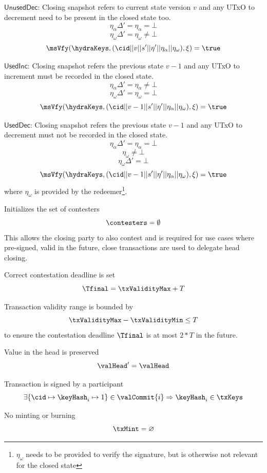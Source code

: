 \begin{menumerate}
\begin{menumerate}
	\item $\mathsf{UnusedDec}$: Closing snapshot refers to current state version $v$ and any UTxO to decrement need to be present in the closed state too.
	\[
	  \eta_\alpha\Delta' = \eta_\alpha = \bot
	\]
	\[
	  \eta_\omega\Delta' = \eta_\omega \neq \bot
	\]
	\[
	  \msVfy(\hydraKeys,(\cid || v || s' || \eta' || \eta_\alpha || \eta_\omega),\xi) = \true
	\]
	\item $\mathsf{UsedInc}$: Closing snapshot refers the previous state $v - 1$ and any UTxO to increment must be recorded in the closed state.
	  \[
		\eta_\alpha\Delta' = \eta_\alpha \neq \bot
	  \]
	  \[
	    \eta_\omega\Delta' = \eta_\omega = \bot
	  \]
	  \[
		\msVfy(\hydraKeys,(\cid || v - 1 || s' || \eta' || \eta_\alpha || \eta_\omega ),\xi) = \true
	\]
	\item $\mathsf{UsedDec}$: Closing snapshot refers the previous state $v - 1$ and any UTxO to decrement must not be recorded in the closed state.
	  \[
		\eta_\alpha\Delta' = \eta_\alpha = \bot
	  \]
	  \[ 
	    \eta_\omega \neq  \bot
	  \]
	  \[ 
	    \eta_\omega\Delta' = \bot
	  \]
	\[
	  \msVfy(\hydraKeys,(\cid || v - 1 || s' || \eta' || \eta_\alpha || \eta_\omega),\xi) = \true
	\]
	where $\eta_\omega$ is provided by the redeemer\footnote{$\eta_\omega$ needs to be provided to verify the signature, but is otherwise not relevant for the closed state}.
  \end{menumerate}

  \item Initializes the set of contesters
  \[
	\contesters = \emptyset
  \]
  This allows the closing party to also contest and is required for use
  cases where pre-signed, valid in the future, close transactions are
  used to delegate head closing.

  \item Correct contestation deadline is set
  \[
	\Tfinal = \txValidityMax + T
  \]
  \item Transaction validity range is bounded by
  \[
	\txValidityMax - \txValidityMin \leq T
  \]
  to ensure the contestation deadline $\Tfinal$ is at most $2*T$ in the future.
  \item Value in the head is preserved
  \[
	\valHead' = \valHead
  \]
  \item Transaction is signed by a participant
  \[
	\exists \{\cid \mapsto \keyHash_{i} \mapsto 1\} \in \valCommit{i} \Rightarrow \keyHash_{i} \in \txKeys
  \]
  \item No minting or burning
  \[
	\txMint = \varnothing
  \]
\end{menumerate}

